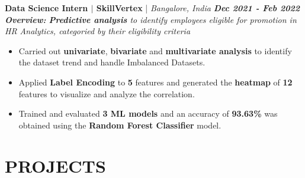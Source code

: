 \documentclass[a4paper,9pt]{extarticle}
\begin{document}
\vspace{-0.1cm}
\noindent
\textbf{Data Science Intern $|$ SkillVertex} | \textit{Bangalore, India} \hfill \textbf{\textit{Dec 2021 - Feb 2022}} \\ %
\textit{\textbf{Overview:} \textbf{Predictive analysis} to identify employees eligible for promotion in HR Analytics, categoried by their eligibility criteria}  %
\vspace{-0.15cm}
\begin{itemize} %
    \item Carried out \textbf{univariate}, \textbf{bivariate} and \textbf{multivariate analysis} to identify the dataset trend and handle Imbalanced Datasets.
    \item Applied \textbf{Label Encoding} to \textbf{5} features and generated the \textbf{heatmap} of \textbf{12} features to visualize and analyze the correlation.
    \item Trained and evaluated \textbf{3 ML models} and an accuracy of \textbf{93.63\%} was obtained using the \textbf{Random Forest Classifier} model.
\end{itemize}

\vspace{-0.3cm}
\section*{PROJECTS}
\end{document}
